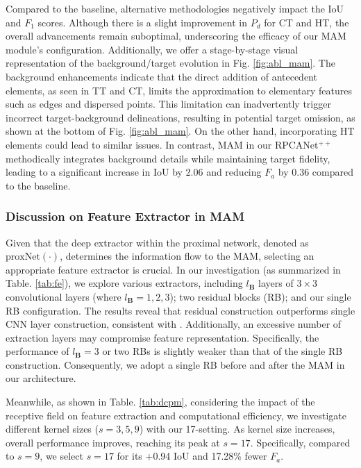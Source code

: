 \documentclass[10pt,journal,compsoc]{IEEEtran}
\begin{document}
Compared to the baseline, alternative methodologies negatively impact the IoU and \(F_1\) scores. Although there is a slight improvement in \(P_d\) for CT and HT, the overall advancements remain suboptimal, underscoring the efficacy of our MAM module's configuration. Additionally, we offer a stage-by-stage visual representation of the background/target evolution in Fig. \ref{fig:abl_mam}. The background enhancements indicate that the direct addition of antecedent elements, as seen in TT and CT, limits the approximation to elementary features such as edges and dispersed points. This limitation can inadvertently trigger incorrect target-background delineations, resulting in potential target omission, as shown at the bottom of Fig. \ref{fig:abl_mam}. On the other hand, incorporating HT elements could lead to similar issues. In contrast, MAM in our RPCANet$^{++}$ methodically integrates background details while maintaining target fidelity, leading to a significant increase in IoU by 2.06 and reducing $F_a$ by 0.36 compared to the baseline.


\subsubsection{Discussion on Feature Extractor in MAM}
Given that the deep extractor within the proximal network, denoted as $\text{proxNet}(\cdot)$, determines the information flow to the MAM, selecting an appropriate feature extractor is crucial. In our investigation (as summarized in Table. \ref{tab:fe}), we explore various extractors, including $l_\mathbf{B}$ layers of $3\times 3$ convolutional layers (where $l_\mathbf{B}=1,2,3$); two residual blocks (RB); and our single RB configuration. The results reveal that residual construction outperforms single CNN layer construction, consistent with \cite{wu-2024-rpcanet}. Additionally, an excessive number of extraction layers may compromise feature representation. Specifically, the performance of $l_{\mathbf{B}}= 3$ or two RBs is slightly weaker than that of the single RB construction. Consequently, we adopt a single RB before and after the MAM in our architecture.

Meanwhile, as shown in Table. \ref{tab:dcpm}, considering the impact of the receptive field on feature extraction and computational efficiency, we investigate different kernel sizes ($s=3,5,9$) with our 17-setting. As kernel size increases, overall performance improves, reaching its peak at $s\!=\!17$. Specifically, compared to $s\!=\!9$, we select $s\!=\!17$ for its +0.94 IoU and 17.28\% fewer $F_a$.  
\end{document}
